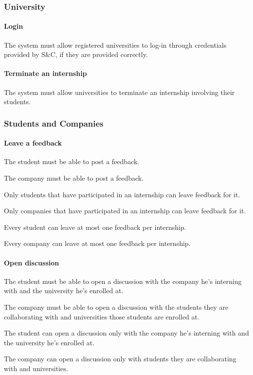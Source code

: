 \subsubsection{University}
\paragraph{Login}
\begin{requirements}[resume]
\item The system must allow registered universities to log-in through credentials provided by S\&C, if they are provided correctly.
\end{requirements}
\paragraph{Terminate an internship}
\begin{requirements}[resume]
\item The system must allow universities to terminate an internship involving their students.
\end{requirements}
\subsubsection{Students and Companies}
\paragraph{Leave a feedback}
\begin{requirements}[resume]
\item The student must be able to post a feedback.
\item The company must be able to post a feedback.
\item Only students that have participated in an internship can leave feedback for it.
\item Only companies that have participated in an internship can leave feedback for it.
\item Every student can leave at most one feedback per internship.
\item Every company can leave at most one feedback per internship.
\end{requirements}
\paragraph{Open discussion}
\begin{requirements}[resume]
\item The student must be able to open a discussion with the company he’s interning with and the university he’s enrolled at.
\item The company must be able to open a discussion with the students they are collaborating with and universities those students are enrolled at.
\item The student can open a discussion only with the company he’s interning with and the university he’s enrolled at.
\item The company can open a discussion only with students they are collaborating with and  universities.
\end{requirements}
